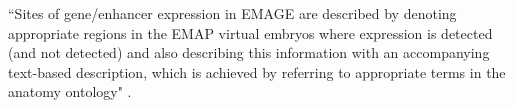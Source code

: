 ``Sites of gene/enhancer expression in EMAGE are described by denoting appropriate regions in the EMAP virtual embryos where expression is detected (and not detected) and also describing this information with an accompanying text-based description, which is achieved by referring to appropriate terms in the anatomy ontology" \cite{emap}.